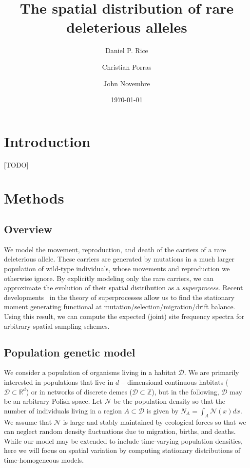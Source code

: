 \documentclass{article}
\title{The spatial distribution of rare deleterious alleles}
\author{Daniel P. Rice \\
        \and Christian Porras \\
        \and John Novembre}
\date{\today}
\begin{document}
\maketitle

\abstract{[TODO]}

\section*{Introduction}
[TODO]
\section*{Methods}

\subsection*{Overview}
We model the movement, reproduction, and death of the carriers of a rare deleterious allele.
These carriers are generated by mutations in a much larger population of wild-type individuals, whose movements and reproduction we otherwise ignore.
By explicitly modeling only the rare carriers, we can approximate the evolution of their spatial distribution as a \emph{superprocess}.
Recent developments~\cite{recent, developments} in the theory of superprocesses allow us to find the stationary moment generating functional at mutation/selection/migration/drift balance.
Using this result, we can compute the expected (joint) site frequency spectra for arbitrary spatial sampling schemes.

\subsection*{Population genetic model}

We consider a population of organisms living in a habitat $\mathcal{D}$.
We are primarily interested in populations that live in $d-$dimensional continuous habitats ($\mathcal{D} \subset \mathbb{R}^d$) or in networks of discrete demes ($\mathcal{D} \subset \mathbb{Z}$),
but in the following, $\mathcal{D}$ may be an arbitrary Polish space.
Let $\mathcal{N}$ be the population density so that the number of individuals living in a region $A \subset \mathcal{D}$ is given by $N_A = \int_A \mathcal{N}(x) dx$.
We assume that $\mathcal{N}$ is large and stably maintained by ecological forces so that we can neglect random density fluctuations due to migration, births, and deaths.
While our model may be extended to include time-varying population densities, here we will focus on spatial variation by computing stationary distributions of time-homogeneous models.
\end{document}
